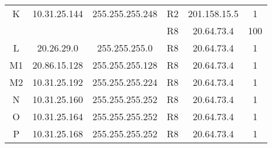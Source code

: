 \begin{tabular}{|c|c|c|c|c|c|}
 	\hline
	K & 10.31.25.144 & 255.255.255.248 & R2 & 201.158.15.5 & 1\\
	  &            &                 & R8  & 20.64.73.4  & 100\\
 	\hline
	L & 20.26.29.0 & 255.255.255.0 & R8 & 20.64.73.4 & 1\\
	\hline
	M1 & 20.86.15.128 & 255.255.255.128 & R8 & 20.64.73.4 & 1\\
	\hline
	M2 & 10.31.25.192 & 255.255.255.224 & R8 & 20.64.73.4 & 1\\
	\hline
	N & 10.31.25.160 & 255.255.255.252 & R8 & 20.64.73.4& 1\\
	\hline
	O & 10.31.25.164 & 255.255.255.252 & R8 & 20.64.73.4 & 1\\
	\hline
	P & 10.31.25.168 & 255.255.255.252 & R8 & 20.64.73.4 & 1\\
	\hline
\end{tabular}



